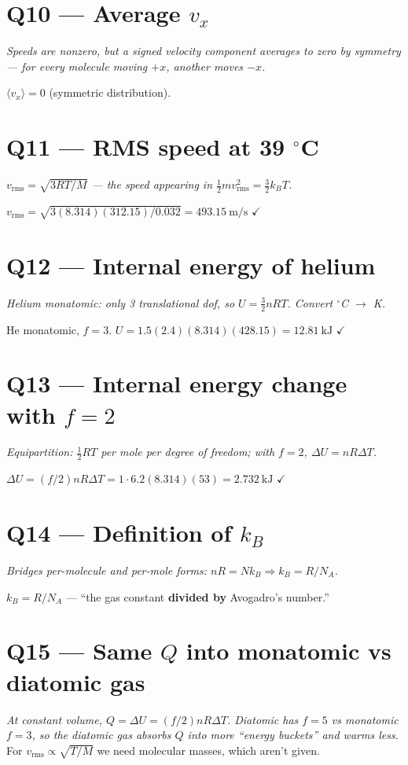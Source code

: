 \documentclass[11pt]{article}
\newcommand{\checkmk}{\ensuremath{\checkmark}}
\begin{document}
\section*{Q10 --- Average $v_x$}
\emph{Speeds are nonzero, but a signed velocity component averages to zero by symmetry --- for every molecule moving $+x$, another moves $-x$.}

$\langle v_x\rangle = \boxed{0}$ (symmetric distribution).

\section*{Q11 --- RMS speed at 39 $^\circ$C}
\emph{$v_{\text{rms}} = \sqrt{3RT/M}$ --- the speed appearing in $\tfrac12 m v_{\text{rms}}^2 = \tfrac32 k_BT$.}

$v_{\text{rms}} = \sqrt{3(8.314)(312.15)/0.032} = \boxed{493.15\ \text{m/s}}$ \checkmk

\section*{Q12 --- Internal energy of helium}
\emph{Helium monatomic: only 3 translational dof, so $U = \tfrac{3}{2}nRT$. Convert $^\circ$C $\to$ K.}

He monatomic, $f=3$. $U = 1.5(2.4)(8.314)(428.15) = \boxed{12.81\ \text{kJ}}$ \checkmk

\section*{Q13 --- Internal energy change with $f=2$}
\emph{Equipartition: $\tfrac12 RT$ per mole per degree of freedom; with $f=2$, $\Delta U = nR\Delta T$.}

$\Delta U = (f/2)nR\Delta T = 1\cdot 6.2(8.314)(53) = \boxed{2.732\ \text{kJ}}$ \checkmk

\section*{Q14 --- Definition of $k_B$}
\emph{Bridges per-molecule and per-mole forms: $nR = Nk_B \Rightarrow k_B = R/N_A$.}

$k_B = R/N_A$ --- ``the gas constant \textbf{divided by} Avogadro's number.''

\section*{Q15 --- Same $Q$ into monatomic vs diatomic gas}
\emph{At constant volume, $Q=\Delta U = (f/2)nR\Delta T$. Diatomic has $f=5$ vs monatomic $f=3$, so the diatomic gas absorbs $Q$ into more ``energy buckets'' and warms less.} For $v_{\text{rms}}\propto\sqrt{T/M}$ we need molecular masses, which aren't given.
\end{document}
